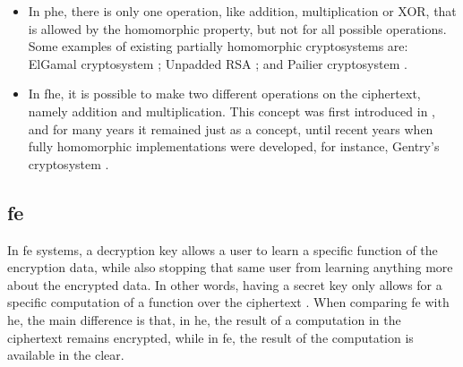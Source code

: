 \begin{itemize}
    
    \item In \ac{phe}, there is only one operation, like addition, multiplication or XOR, that is allowed by the homomorphic property, but not for all possible operations. Some examples of existing partially homomorphic cryptosystems are:
    ElGamal cryptosystem \cite{elgamal1985public}; Unpadded RSA \cite{rivest1978method}; and Pailier cryptosystem \cite{paillier1999public}.

    \item In \ac{fhe}, it is possible to make two different operations on the ciphertext, namely addition and multiplication. This concept was first introduced in \cite{rivest1978data}, and for many years it remained just as a concept, until recent years when fully homomorphic implementations were developed, for instance, Gentry's cryptosystem \cite{gentry2009fully}.
\end{itemize}


\subsection{\acl{fe}}
\label{ssec:FunctionalEncryption}


In \acf{fe} systems, a decryption key allows a user to learn a specific function of the encryption data, while also stopping that same user from learning anything more about the encrypted data. In other words, having a secret key only allows for a specific computation of a function over the ciphertext \cite{boneh2011functional}. When comparing \ac{fe} with \ac{he}, the main difference is that, in \ac{he}, the result of a computation in the ciphertext remains encrypted, while in \ac{fe}, the result of the computation is available in the clear. 



